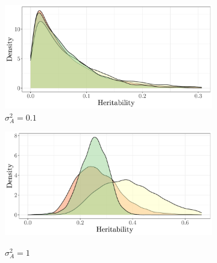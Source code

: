 \begin{figure}
    \centering
    \begin{subfigure}[b]{0.49\textwidth}
        \caption{$\sigma^2_A=0.1$}
        \includegraphics[width=\textwidth]{figures/qgglmm-comparison-simulationva0.1.pdf}     
    \end{subfigure}
    \begin{subfigure}[b]{0.49\textwidth}
        \caption{$\sigma^2_A=1$}
        \includegraphics[width=\textwidth]{figures/qgglmm-comparison-simulationva1.pdf}\label{fig:qgglmm simulation:bigvA}
    \end{subfigure}
    \begin{subfigure}[b]{0.25\textwidth}

\end{subfigure}
\end{figure}
